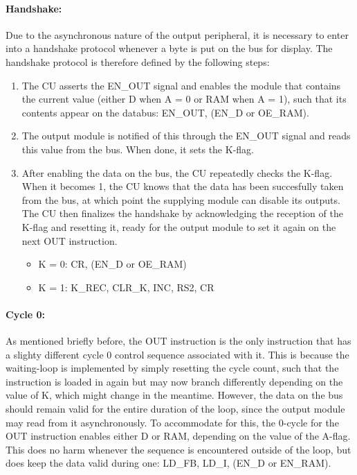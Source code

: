 \paragraph{Handshake:} Due to the asynchronous nature of the output peripheral, it is necessary to enter into a handshake protocol whenever a byte is put on the bus for display. The handshake protocol is therefore defined by the following steps:
\begin{enumerate}
\item The CU asserts the EN\_OUT signal and enables the module that contains the current value (either D when A = 0 or RAM when A = 1), such that its contents appear on the databus: EN\_OUT, (EN\_D or OE\_RAM).
\item The output module is notified of this through the EN\_OUT signal and reads this value from the bus. When done, it sets the K-flag.
\item After enabling the data on the bus, the CU repeatedly checks the K-flag. When it becomes 1, the CU knows that the data has been succesfully taken from the bus, at which point the supplying module can disable its outputs. The CU then finalizes the handshake by acknowledging the reception of the K-flag and resetting it, ready for the output module to set it again on the next OUT instruction.
  \begin{itemize}
  \item K = 0: CR, (EN\_D or OE\_RAM)
  \item K = 1: K\_REC, CLR\_K, INC, RS2, CR   
  \end{itemize}
\end{enumerate}


\paragraph{Cycle 0:} As mentioned briefly before, the OUT instruction is the only instruction that has a slighty different cycle 0 control sequence associated with it. This is because the waiting-loop is implemented by simply resetting the cycle count, such that the instruction is loaded in again but may now branch differently depending on the value of K, which might change in the meantime. However, the data on the bus should remain valid for the entire duration of the loop, since the output module may read from it asynchronously. To accommodate for this, the 0-cycle for the OUT instruction enables either D or RAM, depending on the value of the A-flag. This does no harm whenever the sequence is encountered outside of the loop, but does keep the data valid during one: LD\_FB, LD\_I, (EN\_D or EN\_RAM).

